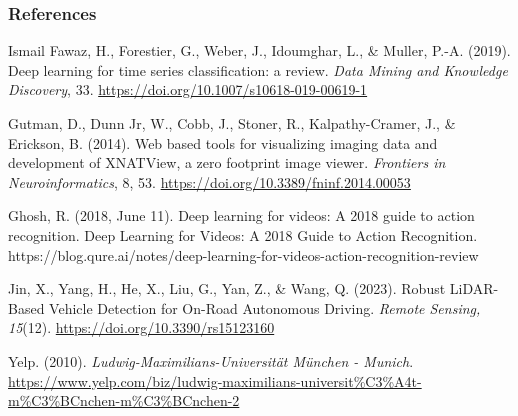 \begin{vbframe}
\frametitle{References}
\footnotesize{
\begin{thebibliography}{99}
Ismail Fawaz, H., Forestier, G., Weber, J., Idoumghar, L., \& Muller, P.-A. (2019). Deep learning for time series classification: a review. \textit{Data Mining and Knowledge Discovery}, 33. \url{https://doi.org/10.1007/s10618-019-00619-1}

 Gutman, D., Dunn Jr, W., Cobb, J., Stoner, R., Kalpathy-Cramer, J., \& Erickson, B. (2014). Web based tools for visualizing imaging data and development of XNATView, a zero footprint image viewer. \textit{Frontiers in Neuroinformatics}, 8, 53. \url{https://doi.org/10.3389/fninf.2014.00053}

Ghosh, R. (2018, June 11). Deep learning for videos: A 2018 guide to action recognition. Deep Learning for Videos: A 2018 Guide to Action Recognition. https://blog.qure.ai/notes/deep-learning-for-videos-action-recognition-review 


 Jin, X., Yang, H., He, X., Liu, G., Yan, Z., \& Wang, Q. (2023). Robust LiDAR-Based Vehicle Detection for On-Road Autonomous Driving. \textit{Remote Sensing, 15}(12). \url{https://doi.org/10.3390/rs15123160}

Yelp. (2010). \textit{Ludwig-Maximilians-Universität München - Munich}. \url{https://www.yelp.com/biz/ludwig-maximilians-universit%C3%A4t-m%C3%BCnchen-m%C3%BCnchen-2} 


\end{thebibliography}}
\end{vbframe}

